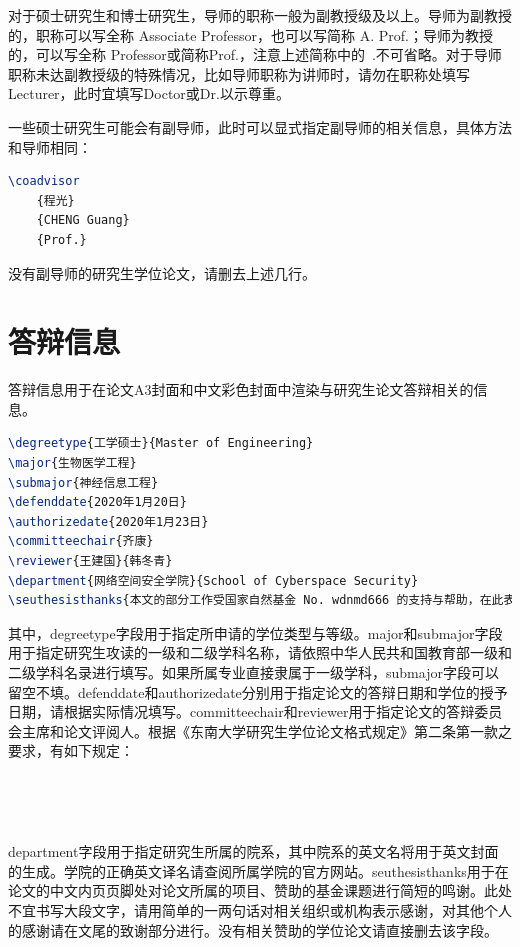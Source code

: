 \noindent 对于硕士研究生和博士研究生，导师的职称一般为副教授级及以上。导师为副教授的，职称可以写全称 Associate Professor，也可以写简称 A. Prof.；导师为教授的，可以写全称 Professor或简称Prof.，注意上述简称中的~.不可省略。对于导师职称未达副教授级的特殊情况，比如导师职称为讲师时，请勿在职称处填写Lecturer，此时宜填写Doctor或Dr.以示尊重。

一些硕士研究生可能会有副导师，此时可以显式指定副导师的相关信息，具体方法和导师相同：

\begin{tcolorbox}
\begin{lstlisting}[language=TeX]
\coadvisor
    {程光}
    {CHENG Guang}
    {Prof.}
\end{lstlisting}
\end{tcolorbox}

\noindent 没有副导师的研究生学位论文，请删去上述几行。

\section{答辩信息}

答辩信息用于在论文A3封面和中文彩色封面中渲染与研究生论文答辩相关的信息。

\begin{tcolorbox}
\begin{lstlisting}[language=TeX]
\degreetype{工学硕士}{Master of Engineering}
\major{生物医学工程}
\submajor{神经信息工程}
\defenddate{2020年1月20日}
\authorizedate{2020年1月23日}
\committeechair{齐康}
\reviewer{王建国}{韩冬青}
\department{网络空间安全学院}{School of Cyberspace Security}
\seuthesisthanks{本文的部分工作受国家自然基金 No. wdnmd666 的支持与帮助，在此表示感谢。}
\end{lstlisting}
\end{tcolorbox}

其中，{\codefont degreetype}字段用于指定所申请的学位类型与等级。{\codefont major}和{\codefont submajor}字段用于指定研究生攻读的一级和二级学科名称，请依照中华人民共和国教育部一级和二级学科名录进行填写。如果所属专业直接隶属于一级学科，{\codefont submajor}字段可以留空不填。{\codefont defenddate}和{\codefont authorizedate}分别用于指定论文的答辩日期和学位的授予日期，请根据实际情况填写。{\codefont committeechair}和{\codefont reviewer}用于指定论文的答辩委员会主席和论文评阅人。根据《东南大学研究生学位论文格式规定》\cite{seugs2015rule}第二条第一款之要求，有如下规定：

~


~

{\codefont department}字段用于指定研究生所属的院系，其中院系的英文名将用于英文封面的生成。学院的正确英文译名请查阅所属学院的官方网站。{\codefont seuthesisthanks}用于在论文的中文内页页脚处对论文所属的项目、赞助的基金课题进行简短的鸣谢。此处不宜书写大段文字，请用简单的一两句话对相关组织或机构表示感谢，对其他个人的感谢请在文尾的致谢部分进行。没有相关赞助的学位论文请直接删去该字段。